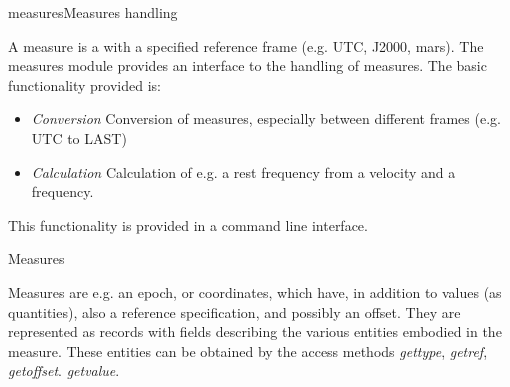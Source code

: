 \begin{ahmodule}{measures}{Measures handling}



\begin{ahdescription}

A measure is a 
with a specified reference frame (e.g. UTC, J2000, mars).
The measures module provides an interface to the handling of measures. The
basic functionality provided is:
\begin{itemize}
\item {\em Conversion} Conversion of measures, especially between different
frames (e.g. UTC to LAST)
\item {\em Calculation} Calculation of e.g. a rest frequency from a velocity
and a frequency.
\end{itemize}
This functionality is provided in a command line interface.





{\large Measures}


Measures are e.g. an epoch, or coordinates, which have, in addition to values
(as quantities), also a reference specification, and possibly an offset. They
are represented as records with fields describing the various entities
embodied in the measure. These entities can be obtained by the access methods
{\em gettype}, {\em getref}, {\em getoffset}. {\em getvalue}.


\end{ahdescription}
\end{ahmodule}
